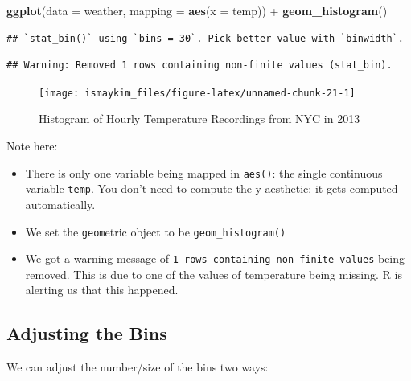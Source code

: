 \documentclass[]{tufte-book}
\newenvironment{Shaded}{\begin{snugshade}}{\end{snugshade}}
\newcommand{\KeywordTok}[1]{\textcolor[rgb]{0.13,0.29,0.53}{\textbf{{#1}}}}
\newcommand{\DataTypeTok}[1]{\textcolor[rgb]{0.13,0.29,0.53}{{#1}}}
\newcommand{\StringTok}[1]{\textcolor[rgb]{0.31,0.60,0.02}{{#1}}}
\newcommand{\NormalTok}[1]{{#1}}
\providecommand{\tightlist}{%
  \setlength{\itemsep}{0pt}\setlength{\parskip}{0pt}}
\begin{document}
\begin{Shaded}
\begin{Highlighting}[]
\KeywordTok{ggplot}\NormalTok{(}\DataTypeTok{data =} \NormalTok{weather, }\DataTypeTok{mapping =} \KeywordTok{aes}\NormalTok{(}\DataTypeTok{x =} \NormalTok{temp)) +}
\StringTok{  }\KeywordTok{geom_histogram}\NormalTok{()}
\end{Highlighting}
\end{Shaded}

\begin{verbatim}
## `stat_bin()` using `bins = 30`. Pick better value with `binwidth`.
\end{verbatim}

\begin{verbatim}
## Warning: Removed 1 rows containing non-finite values (stat_bin).
\end{verbatim}

\begin{figure}

{\centering \texttt{[image: ismaykim\_files/figure-latex/unnamed-chunk-21-1]} 

}

\caption[Histogram of Hourly Temperature Recordings from NYC in 2013]{Histogram of Hourly Temperature Recordings from NYC in 2013}\label{fig:unnamed-chunk-21}
\end{figure}

Note here:

\begin{itemize}
\tightlist
\item
  There is only one variable being mapped in \texttt{aes()}: the single
  continuous variable \texttt{temp}. You don't need to compute the
  y-aesthetic: it gets computed automatically.
\item
  We set the \texttt{geom}etric object to be \texttt{geom\_histogram()}
\item
  We got a warning message of
  \texttt{1\ rows\ containing\ non-finite\ values} being removed. This
  is due to one of the values of temperature being missing. R is
  alerting us that this happened.
\end{itemize}

\subsection{Adjusting the Bins}\label{adjustbins}

We can adjust the number/size of the bins two ways:
\end{document}
